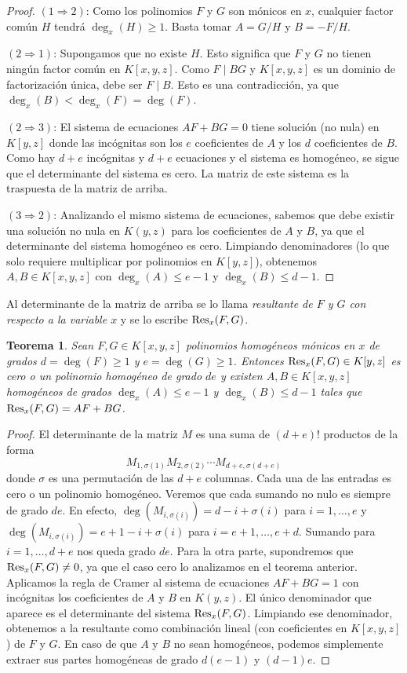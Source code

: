 \documentclass[a4paper, 11pt]{article}
\newcounter{numerodetema}
\theoremstyle{plain}
\newtheorem{teor}{Teorema}[numerodetema]
\theoremstyle{definition}
\begin{document}
\begin{proof}
$(1\Rightarrow 2)$: Como los polinomios $F$ y $G$ son mónicos en $x$, cualquier
factor común $H$ tendrá $\deg_x(H)\geq 1$. Basta tomar $A=G/H$ y $B=-F/H$.

$(2\Rightarrow 1)$: Supongamos que no existe $H$. Esto significa que $F$ y $G$ no
tienen ningún factor común en $K[x,y,z]$. Como $F\mid BG$ y $K[x,y,z]$ es un dominio
de factorización única, debe ser $F\mid B$. Esto es una contradicción, ya que
$\deg_x(B)<\deg_x(F)=\deg(F)$.

$(2\Rightarrow 3)$: El sistema de ecuaciones $AF+BG=0$ tiene solución (no nula) en
$K[y,z]$ donde las incógnitas son los $e$ coeficientes de $A$ y los $d$ coeficientes
de $B$. Como hay $d+e$ incógnitas y $d+e$ ecuaciones y el sistema es homogéneo,
se sigue que el determinante del sistema es cero. La matriz de este sistema es la
traspuesta de la matriz de arriba.

$(3\Rightarrow 2)$: Analizando el mismo sistema de ecuaciones, sabemos que debe
existir una solución no nula en $K(y,z)$ para los coeficientes de $A$ y $B$, ya
que el determinante del sistema homogéneo es cero. Limpiando denominadores (lo que
solo requiere multiplicar por polinomios en $K[y,z]$), obtenemos $A,B\in K[x,y,z]$
con $\deg_x(A)\leq e-1$ y $\deg_x(B)\leq d-1$.
\end{proof}

Al determinante de la matriz de arriba se lo llama \emph{resultante de $F$
y $G$ con respecto a la variable $x$} y se lo escribe ${\rm Res}_x(F,G)$.

\begin{teor}\label{teor-2}
Sean $F,G\in K[x,y,z]$ polinomios homogéneos mónicos en $x$ de grados $d=\deg(F)\geq 1$ y
$e=\deg(G)\geq 1$. Entonces ${\rm Res}_x(F,G)\in K[y,z]$ es cero o un polinomio
homogéneo de grado $de$ y existen $A,B\in K[x,y,z]$ homogéneos de grados
$\deg_x(A)\leq e-1$ y $\deg_x(B)\leq d-1$ tales que ${\rm Res}_x(F,G)=AF+BG$.
\end{teor}
\begin{proof}
El determinante de la matriz $M$ es una suma de $(d+e)!$ productos de la forma
\[M_{1,\sigma(1)}M_{2,\sigma(2)}\cdots M_{d+e,\sigma(d+e)}\] donde $\sigma$ es
una permutación de las $d+e$ columnas. Cada una de las entradas es cero o un
polinomio homogéneo. Veremos que cada sumando no nulo es siempre de grado $de$.
En efecto, $\deg(M_{i,\sigma(i)})=d-i+\sigma(i)$ para $i=1,\ldots,e$ y
$\deg(M_{i,\sigma(i)})=e+1-i+\sigma(i)$ para $i=e+1,\ldots,e+d$.
Sumando para $i=1,\ldots,d+e$ nos queda grado $de$. Para la otra parte, supondremos
que ${\rm Res}_x(F,G)\neq 0$, ya que el caso cero lo analizamos en el teorema anterior.
Aplicamos la regla de Cramer al sistema de ecuaciones $AF+BG=1$ con incógnitas los
coeficientes de $A$ y $B$ en $K(y,z)$. El único denominador que aparece es el
determinante del sistema ${\rm Res}_x(F,G)$. Limpiando ese denominador, obtenemos
a la resultante como combinación lineal (con coeficientes en $K[x,y,z]$) de $F$ y
$G$. En caso de que $A$ y $B$ no sean homogéneos, podemos simplemente extraer sus
partes homogéneas de grado $d(e-1)$ y $(d-1)e$.
\end{proof}
\end{document}

